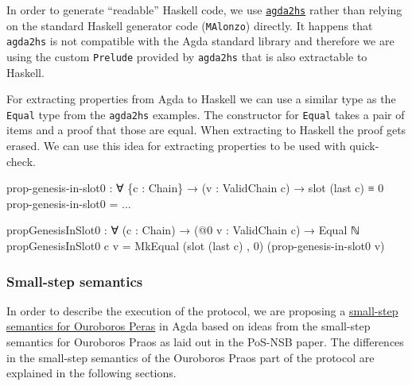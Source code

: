 \documentclass[10pt]{article}
\newenvironment{Shaded}{}{}
\newcommand{\DecValTok}[1]{\textcolor[rgb]{0.25,0.63,0.44}{#1}}
\newcommand{\NormalTok}[1]{#1}
\newcommand{\OtherTok}[1]{\textcolor[rgb]{0.00,0.44,0.13}{#1}}
\begin{document}
In order to generate ``readable'' Haskell code, we use
\href{https://agda.github.io/agda2hs}{\color{blue}\texttt{agda2hs}} rather than relying on
the standard Haskell generator code (\texttt{MAlonzo}) directly. It
happens that \texttt{agda2hs} is not compatible with the Agda standard
library and therefore we are using the custom \texttt{Prelude} provided
by \texttt{agda2hs} that is also extractable to Haskell.

For extracting properties from Agda to Haskell we can use a similar type
as the \texttt{Equal} type from the \texttt{agda2hs} examples. The
constructor for \texttt{Equal} takes a pair of items and a proof that
those are equal. When extracting to Haskell the proof gets erased. We
can use this idea for extracting properties to be used with quick-check.

\begin{Shaded}
\begin{Highlighting}[]
\NormalTok{prop{-}genesis{-}in{-}slot0 }\OtherTok{:} \OtherTok{∀} \OtherTok{\{}\NormalTok{c }\OtherTok{:}\NormalTok{ Chain}\OtherTok{\}} \OtherTok{→} \OtherTok{(}\NormalTok{v }\OtherTok{:}\NormalTok{ ValidChain c}\OtherTok{)} \OtherTok{→}\NormalTok{ slot }\OtherTok{(}\NormalTok{last c}\OtherTok{)}\NormalTok{ ≡ }\DecValTok{0}
\NormalTok{prop{-}genesis{-}in{-}slot0 }\OtherTok{=} \OtherTok{...}

\NormalTok{propGenesisInSlot0 }\OtherTok{:} \OtherTok{∀} \OtherTok{(}\NormalTok{c }\OtherTok{:}\NormalTok{ Chain}\OtherTok{)} \OtherTok{→} \OtherTok{(@}\DecValTok{0}\NormalTok{ v }\OtherTok{:}\NormalTok{ ValidChain c}\OtherTok{)} \OtherTok{→}\NormalTok{ Equal ℕ}
\NormalTok{propGenesisInSlot0 c v }\OtherTok{=}\NormalTok{ MkEqual }\OtherTok{(}\NormalTok{slot }\OtherTok{(}\NormalTok{last c}\OtherTok{)}\NormalTok{ , }\DecValTok{0}\OtherTok{)} \OtherTok{(}\NormalTok{prop{-}genesis{-}in{-}slot0 v}\OtherTok{)}
\end{Highlighting}
\end{Shaded}

\subsubsection{Small-step semantics}\label{small-step-semantics}

In order to describe the execution of the protocol, we are proposing a
\href{../../src/Peras/SmallStep.lagda.md}{small-step semantics for
Ouroboros Peras} in Agda based on ideas from the small-step semantics
for Ouroboros Praos as laid out in the PoS-NSB paper. The differences in
the small-step semantics of the Ouroboros Praos part of the protocol are
explained in the following sections.
\end{document}
